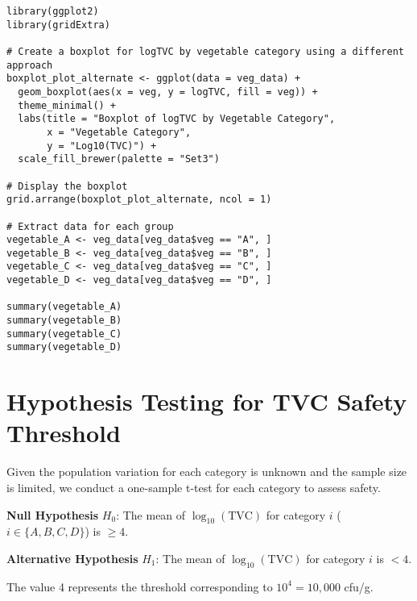 \documentclass{article}
\begin{document}
\begin{verbatim}
library(ggplot2)
library(gridExtra)

# Create a boxplot for logTVC by vegetable category using a different approach
boxplot_plot_alternate <- ggplot(data = veg_data) +
  geom_boxplot(aes(x = veg, y = logTVC, fill = veg)) +
  theme_minimal() +
  labs(title = "Boxplot of logTVC by Vegetable Category",
       x = "Vegetable Category",
       y = "Log10(TVC)") +
  scale_fill_brewer(palette = "Set3")

# Display the boxplot
grid.arrange(boxplot_plot_alternate, ncol = 1)

# Extract data for each group
vegetable_A <- veg_data[veg_data$veg == "A", ]
vegetable_B <- veg_data[veg_data$veg == "B", ]
vegetable_C <- veg_data[veg_data$veg == "C", ]
vegetable_D <- veg_data[veg_data$veg == "D", ]

summary(vegetable_A)
summary(vegetable_B)
summary(vegetable_C)
summary(vegetable_D)
\end{verbatim}

\section*{Hypothesis Testing for TVC Safety Threshold}

Given the population variation for each category is unknown and the sample size is limited, we conduct a one-sample t-test for each category to assess safety.

\textbf{Null Hypothesis} $H_0$: The mean of $\log_{10}(\text{TVC})$ for category $i$ ($i \in \{A,B,C,D\}$) is $\geq 4$.

\textbf{Alternative Hypothesis} $H_1$: The mean of $\log_{10}(\text{TVC})$ for category $i$ is $< 4$.

The value 4 represents the threshold corresponding to $10^4 = 10{,}000$ cfu/g.
\end{document}
